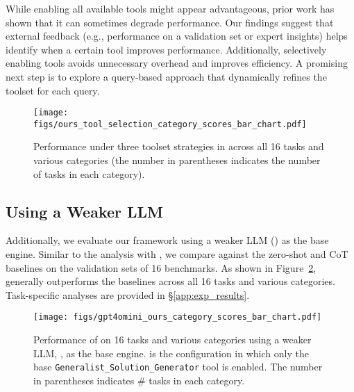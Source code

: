 While enabling all available tools might appear advantageous, prior work \cite{lumer2024toolshed,fore2024geckopt,paramanayakam2024less} has shown that it can sometimes degrade performance. Our findings suggest that external feedback (e.g., performance on a validation set or expert insights) helps identify when a certain tool improves performance. Additionally, selectively enabling tools avoids unnecessary overhead and improves efficiency. A promising next step is to explore a query-based approach that dynamically refines the toolset for each query.

\begin{figure}[th!]
    \centering
    \texttt{[image: figs/ours\_tool\_selection\_category\_scores\_bar\_chart.pdf]}
    \vspace{-5mm}
    \caption{Performance under three toolset strategies in \model across all 16 tasks and various categories (the number in parentheses indicates the number of tasks in each category).}
\label{fig:ours_tool_selection_category_scores_bar_chart}
\end{figure}

\subsection{Using a Weaker LLM}

Additionally, we evaluate our framework using a weaker LLM (\gptmini) as the base engine. Similar to the analysis with \gpt, we compare \model against the zero-shot and CoT baselines on the validation sets of 16 benchmarks. As shown in Figure~\ref{fig:gpt4omini_ours_category_scores_bar_chart}, \model generally outperforms the baselines across all 16 tasks and various categories. Task-specific analyses are provided in \S\ref{app:exp_results}.

\begin{figure}[th!]
    \centering
    \texttt{[image: figs/gpt4omini\_ours\_category\_scores\_bar\_chart.pdf]}
    \vspace{-3mm}
    \caption{Performance of \model on 16 tasks and various categories using a weaker LLM, \gptmini, as the base engine. \modelbase is the configuration in which only the base \texttt{Generalist\_Solution\_Generator} tool is enabled. The number in parentheses indicates $\#$ tasks in each category.}
\label{fig:gpt4omini_ours_category_scores_bar_chart}
\end{figure}

